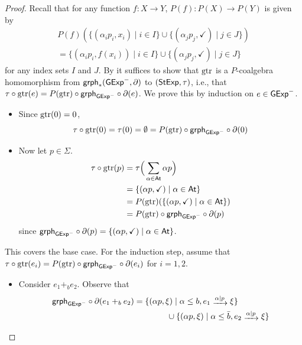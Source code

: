 \documentclass[orivec,envcountsect,envcountsame]{llncs}
\begin{document}
\lemmagtrahomom*

\begin{proof}
	Recall that for any function \(f \colon X \to Y\), \(P(f)\colon P(X) \to P(Y)\) is given by
	\begin{gather*}
		P(f)(\{(\alpha_i p_i, x_i) \mid i \in I\} \cup \{(\alpha_j p_j, \checkmark) \mid j \in J\})
		\\=
		\{(\alpha_i p_i, f(x_i)) \mid i \in I\}
		\cup \{(\alpha_j p_j, \checkmark) \mid j \in J\}
	\end{gather*}
	for any index sets \(I\) and \(J\).
    By  it suffices to show that $\operatorname{gtr}$ is a $P$-coalgebra homomorphism from \(\mathsf{grph}_*(\mathsf{GExp}^-, \partial)\) to $(\mathsf{StExp}, \tau)$, i.e., that \(\tau \circ \operatorname{gtr}(e) = P(\operatorname{gtr}) \circ \mathsf{grph}_{\mathsf{GExp}^-} \circ \partial(e)\).
    We prove this by induction on \(e \in \mathsf{GExp}^-\).
	\begin{itemize}
		\item Since \(\operatorname{gtr}(0) = 0\), \[
			\tau \circ \operatorname{gtr}(0) = \tau(0) = \emptyset = P(\operatorname{gtr})\circ \mathsf{grph}_{\mathsf{GExp}^-} \circ \partial(0)
		\]
		\item Now let \(p \in \Sigma\).
		\begin{align*}
			\tau \circ \operatorname{gtr}(p)
			&= \tau\Big(\sum_{\alpha \in \mathsf{At}} \alpha p\Big) \\
			&= \{(\alpha p, \checkmark) \mid \alpha \in \mathsf{At}\} \\
			&= P(\operatorname{gtr}) (\{(\alpha p, \checkmark) \mid \alpha \in \mathsf{At}\}) \\
			&= P(\operatorname{gtr}) \circ \mathsf{grph}_{\mathsf{GExp}^-} \circ \partial(p)
		\end{align*}
		since \(\mathsf{grph}_{\mathsf{GExp}^-} \circ \partial(p) = \{(\alpha p, \checkmark) \mid \alpha \in \mathsf{At}\}\).
	\end{itemize}
	This covers the base case.
	For the induction step, assume that \(\tau\circ\operatorname{gtr}(e_i) = P(\operatorname{gtr})\circ\mathsf{grph}_{\mathsf{GExp}^-}\circ\partial(e_i)\) for \(i = 1, 2\).
	\begin{itemize}
		\item Consider \(e_1 +_b e_2\).
		Observe that
		\begin{equation}
			\label{graph eq 1}
			\begin{aligned}
				\grph_{\GExp^-}\circ\partial(e_1 +_b e_2)
				&= \{(\alpha p, \xi) \mid \alpha \le b, e_1 \tr{\alpha \mid p} \xi\} \\&\hspace{4em}\cup
				\{(\alpha p, \xi) \mid \alpha \le \bar b, e_2 \tr{\alpha \mid p} \xi\}
			\end{aligned}

\end{equation}
\end{itemize}
\end{proof}
\end{document}
